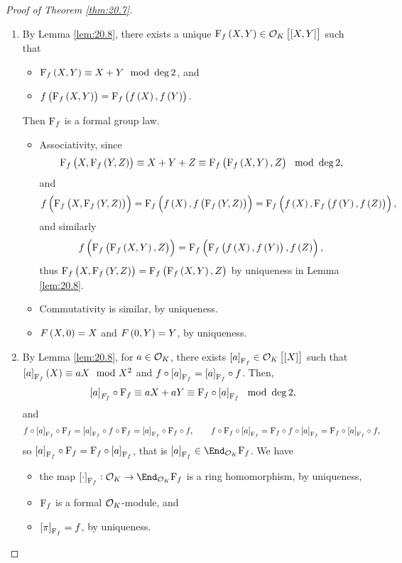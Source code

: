 
\begin{proof}[Proof of Theorem \ref{thm:20.7}]
\hfill
\begin{enumerate}
\item By Lemma \ref{lem:20.8}, there exists a unique $ \F_f\br{X, Y} \in \OOO_K\sbr{\sbr{X, Y}} $ such that
\begin{itemize}
\item $ \F_f\br{X, Y} \equiv X + Y \mod \deg 2 $, and
\item $ f\br{\F_f\br{X, Y}} = \F_f\br{f\br{X}, f\br{Y}} $.
\end{itemize}
Then $ \mathrm{F}_f $ is a formal group law.
\begin{itemize}
\item Associativity, since
$$ \F_f\br{X, \F_f\br{Y, Z}} \equiv X + Y + Z \equiv \F_f\br{\F_f\br{X, Y}, Z} \mod \deg 2, $$
and
$$ f\br{\F_f\br{X, \F_f\br{Y, Z}}} = \F_f\br{f\br{X}, f\br{\F_f\br{Y, Z}}} = \F_f\br{f\br{X}, \F_f\br{f\br{Y}, f\br{Z}}}, $$
and similarly
$$ f\br{\F_f\br{\F_f\br{X, Y}, Z}} = \F_f\br{\F_f\br{f\br{X}, f\br{Y}}, f\br{Z}}, $$
thus $ \F_f\br{X, \F_f\br{Y, Z}} = \F_f\br{\F_f\br{X, Y}, Z} $ by uniqueness in Lemma \ref{lem:20.8}.
\item Commutativity is similar, by uniqueness.
\item $ F\br{X, 0} = X $ and $ F\br{0, Y} = Y $, by uniqueness.
\end{itemize}
\item By Lemma \ref{lem:20.8}, for $ a \in \mathcal{O}_K $, there exists $ \sbr{a}_{\F_f} \in \OOO_K\sbr{\sbr{X}} $ such that $ \sbr{a}_{\F_f}\br{X} \equiv aX \mod X^2 $ and $ f \circ \sbr{a}_{\F_f} = \sbr{a}_{\F_f} \circ f $. Then,
$$ \sbr{a}_{F_f} \circ \F_f \equiv aX + aY \equiv \F_f \circ \sbr{a}_{\F_f} \mod \deg 2, $$
and
$$ f \circ \sbr{a}_{\F_f} \circ \F_f = \sbr{a}_{\F_f} \circ f \circ \F_f = \sbr{a}_{\F_f} \circ \F_f \circ f, \qquad f \circ \F_f \circ \sbr{a}_{\F_f} = \F_f \circ f \circ \sbr{a}_{\F_f} = \F_f \circ \sbr{a}_{\F_f} \circ f, $$
so $ \sbr{a}_{\F_f} \circ \F_f = \F_f \circ \sbr{a}_{\F_f} $, that is $ \sbr{a}_{\F_f} \in \End_{\OOO_K} \F_f $. We have
\begin{itemize}
\item the map $ \sbr{\cdot}_{\F_f} : \OOO_K \to \End_{\OOO_K} \F_f $ is a ring homomorphism, by uniqueness,
\item $ \mathrm{F}_f $ is a formal $ \mathcal{O}_K $-module, and
\item $ \sbr{\pi}_{\F_f} = f $, by uniqueness.
\end{itemize}

\end{enumerate}
\end{proof}
